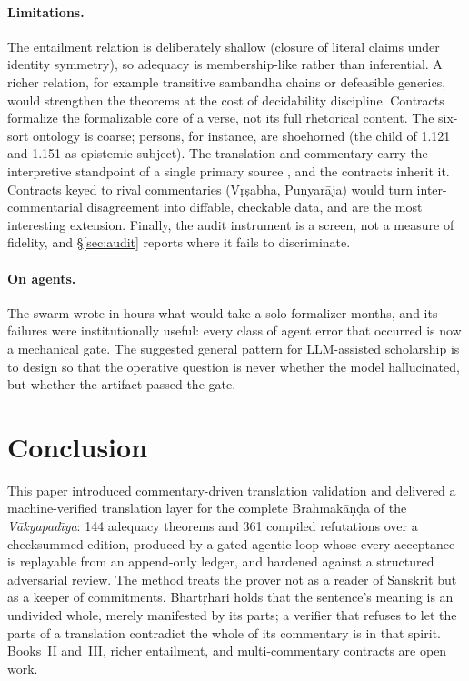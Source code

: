 \documentclass[11pt]{article}
\begin{document}
\paragraph{Limitations.} The entailment relation is deliberately shallow
(closure of literal claims under identity symmetry), so adequacy is
membership-like rather than inferential. A richer relation, for example
transitive sambandha chains or defeasible generics, would strengthen the
theorems at the cost of decidability discipline. Contracts formalize the
formalizable core of a verse, not its full rhetorical content. The six-sort
ontology is coarse; persons, for instance, are shoehorned (the child of
1.121 and 1.151 as epistemic subject). The translation and commentary carry
the interpretive standpoint of a single primary source
\citep{iyer1965vakyapadiya}, and the contracts inherit it. Contracts keyed
to rival commentaries (V\d{r}\d{s}abha, Pu\d{n}yar\={a}ja) would turn
inter-commentarial disagreement into diffable, checkable data, and are the
most interesting extension. Finally, the audit instrument is a screen, not
a measure of fidelity, and \S\ref{sec:audit} reports where it fails to
discriminate.

\paragraph{On agents.} The swarm wrote in hours what would take a solo
formalizer months, and its failures were institutionally useful: every class
of agent error that occurred is now a mechanical gate. The suggested general
pattern for LLM-assisted scholarship is to design so that the operative
question is never whether the model hallucinated, but whether the artifact
passed the gate.

\section{Conclusion}
\label{sec:conclusion}

This paper introduced commentary-driven translation validation and
delivered a machine-verified translation layer for the complete
Brahmak\={a}\d{n}\d{d}a of the \emph{V\={a}kyapad\={\i}ya}: 144 adequacy
theorems and 361 compiled refutations over a checksummed edition, produced
by a gated agentic loop whose every acceptance is replayable from an
append-only ledger, and hardened against a structured adversarial review. The method treats the prover not as a reader of
Sanskrit but as a keeper of commitments. Bhart\d{r}hari holds that the
sentence's meaning is an undivided whole, merely manifested by its parts; a
verifier that refuses to let the parts of a translation contradict the
whole of its commentary is in that spirit. Books~II and~III, richer
entailment, and multi-commentary contracts are open work.
\end{document}
